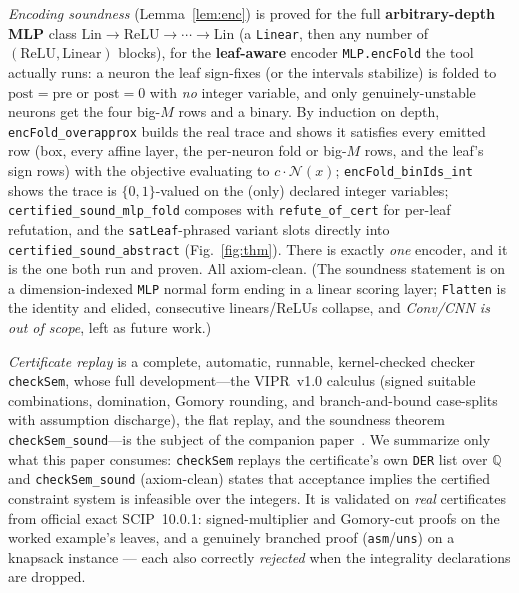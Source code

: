 \documentclass[runningheads]{llncs}
\newcommand{\Q}{\mathbb{Q}}
\newcommand{\net}{\mathcal{N}}
\newcommand{\scip}{\textsc{SCIP}}
\newcommand{\relu}{\ensuremath{\mathrm{ReLU}}}
\newcommand{\code}[1]{\texttt{#1}}
\begin{document}
\emph{Encoding soundness} (Lemma~\ref{lem:enc}) is proved for the full
\textbf{arbitrary-depth MLP} class $\mathrm{Lin}\!\to\!\relu\!\to\!\cdots\!\to\!\mathrm{Lin}$
(a \code{Linear}, then any number of $(\relu,\mathrm{Linear})$ blocks), for the
\textbf{leaf-aware} encoder \code{MLP.encFold} the tool actually runs: a neuron the
leaf sign-fixes (or the intervals stabilize) is folded to $\mathrm{post}=\mathrm{pre}$
or $\mathrm{post}=0$ with \emph{no} integer variable, and only genuinely-unstable
neurons get the four big-$M$ rows and a binary. By induction on depth,
\code{encFold\_overapprox} builds the real trace and shows it satisfies every emitted
row (box, every affine layer, the per-neuron fold or big-$M$ rows, and the leaf's sign
rows) with the objective evaluating to $c\cdot\net(x)$; \code{encFold\_binIds\_int}
shows the trace is $\{0,1\}$-valued on the (only) declared integer variables;
\code{certified\_sound\_mlp\_fold} composes with \code{refute\_of\_cert} for per-leaf
refutation, and the \code{satLeaf}-phrased variant slots directly into
\code{certified\_sound\_abstract} (Fig.~\ref{fig:thm}). There is exactly \emph{one}
encoder, and it is the one both run and proven. All axiom-clean. (The soundness
statement is on a dimension-indexed \code{MLP} normal form ending in a linear scoring
layer; \code{Flatten} is the identity and elided, consecutive linears/ReLUs collapse,
and \emph{Conv/CNN is out of scope}, left as future work.)

\emph{Certificate replay} is a complete, automatic, runnable, kernel-checked checker
\code{checkSem}, whose full development---the VIPR~v1.0 calculus (signed suitable
combinations, domination, Gomory rounding, and branch-and-bound case-splits with
assumption discharge), the flat replay, and the soundness theorem
\code{checkSem\_sound}---is the subject of the companion paper~\cite{companion}. We
summarize only what this paper consumes: \code{checkSem} replays the certificate's own
\code{DER} list over $\Q$ and \code{checkSem\_sound} (axiom-clean) states that
acceptance implies the certified constraint system is infeasible over the integers. It
is validated on \emph{real} certificates from
official exact \scip{}~10.0.1: signed-multiplier and Gomory-cut proofs on the worked
example's leaves, and a genuinely branched proof (\code{asm}/\code{uns}) on a knapsack
instance --- each also correctly \emph{rejected} when the integrality declarations are
dropped.
\end{document}
